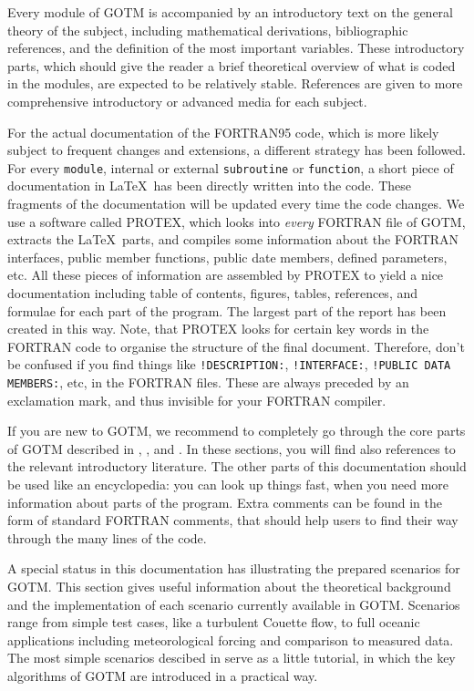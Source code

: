 Every module of GOTM is accompanied by an introductory text on the
general theory of the subject, including mathematical derivations,
bibliographic references, and the definition of the most important
variables. These introductory parts, which should give the reader a
brief theoretical overview of what is coded in the modules, are
expected to be relatively stable. References are given to more
comprehensive introductory or advanced media for each subject.

For the actual documentation of the FORTRAN95 code, which is more
likely subject to frequent changes and extensions, a different
strategy has been followed. For every {\tt module}, internal or
external {\tt subroutine} or {\tt function}, a short piece of
documentation in \LaTeX\ has been directly written into the
code. These fragments of the documentation will be updated every time
the code changes. We use a software called PROTEX, which looks into
\emph{every} FORTRAN file of GOTM, extracts the \LaTeX\ parts, and
compiles some information about the FORTRAN interfaces, public member
functions, public date members, defined parameters, etc. All these
pieces of information are assembled by PROTEX to yield a nice
documentation including table of contents, figures, tables,
references, and formulae for each part of the program. The largest
part of the report has been created in this way. Note, that PROTEX
looks for certain key words in the FORTRAN code to organise the
structure of the final document. Therefore, don't be confused if you
find things like {\tt !DESCRIPTION:}, {\tt !INTERFACE:}, {\tt !PUBLIC
DATA MEMBERS:}, etc, in the FORTRAN files. These are always preceded
by an exclamation mark, and thus invisible for your FORTRAN compiler.

If you are new to GOTM, we recommend to completely go through the core
parts of GOTM described in , ,
and . In these sections, you will find also
references to the relevant introductory literature. The other
parts of this documentation should be used like an encyclopedia: you
can look up things fast, when you need more information about parts
of the program. Extra comments can be found in the form of standard
FORTRAN comments, that should help users to find their way through the many
lines of the code.

A special status in this documentation has 
illustrating the prepared scenarios for GOTM. This section gives
useful information about the theoretical background and the
implementation of each scenario currently available in GOTM. Scenarios
range from simple test cases, like a turbulent Couette flow, to full
oceanic applications including meteorological forcing and comparison
to measured data. The most simple scenarios descibed in 
serve as a little tutorial, in which the key algorithms of
GOTM are introduced in a practical way.


